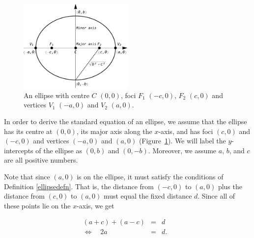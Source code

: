 \begin{figure}
	\begin{center}
			\includegraphics[width=0.5\textwidth]{fig_algebraic_22}
	\caption{An ellipse with centre $C$ $(0,0)$, foci $F_1$ $(-c,0)$, $F_2$ $(c,0)$ and vertices $V_1$ $(-a,0)$ and $V_2$ $(a,0)$.}
	\label{fig_algebraic_22}
	\end{center}
\end{figure}


\ifcourse
In order to derive the standard equation of an ellipse, we assume that the ellipse has its centre at $(0,0)$, its major axis along the $x$-axis, and has foci $(c,0)$ and $(-c,0)$ and vertices $(-a,0)$ and $(a,0)$ (Figure~\ref{fig_algebraic_22}).  We will label the $y$-intercepts of the ellipse as $(0,b)$ and $(0,-b)$. Moreover, we assume $a$, $b$, and $c$ are all positive numbers.

\ifanalysis
	\checkoddpage
{}
 \fi
Note that since $(a,0)$ is on the ellipse, it must satisfy the conditions of Definition \ref{ellipsedefn}.  That is, the distance from $(-c,0)$ to $(a,0)$ plus the distance from  $(c,0)$ to $(a,0)$ must equal the fixed distance $d$.  Since all of these points lie on the $x$-axis, we get

\[ \begin{array}{rclr} 
 (a+c) + (a-c) & = & d & \\ \Leftrightarrow\quad 2a & = & d. \\ \end{array}\]


